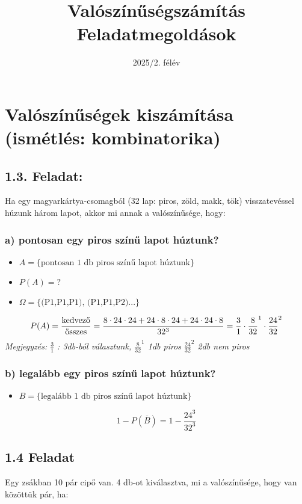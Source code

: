 \documentclass{article}
\title{Valószínűségszámítás Feladatmegoldások}
\author{}
\date{2025/2. félév}
\begin{document}
\maketitle

\section{Valószínűségek kiszámítása (ismétlés: kombinatorika)}

\subsection*{1.3. Feladat:}
Ha egy magyarkártya-csomagból (32 lap: piros, zöld, makk, tök) visszatevéssel húzunk három lapot, akkor mi
annak a valószínűsége, hogy:

\subsubsection*{a) pontosan egy piros színű lapot húztunk?}
\begin{itemize}
    \item $A = \text{\{pontosan 1 db piros színű lapot húztunk\}}$
    \item $P(A) = ?$
    \item $ \Omega = \text{\{(P1,P1,P1), (P1,P1,P2)...\}}$
\end{itemize}
\[P(A) = \frac{\text{kedvező}}{\text{összes}} = 
    \frac{8 \cdot 24 \cdot 24 + 24 \cdot 8 \cdot 24 + 24 \cdot 24 \cdot 8}{32^3} = \\
    \frac{3}{1} \cdot \frac{8}{32}^1 \cdot \frac{24}{32}^2
\]
\textit{Megjegyzés:  $\frac{3}{1}$ : 3db-ból választunk, $\frac{8}{32}^1$ 1db piros  $\frac{24}{32}^2$ 2db nem piros}

\vspace{1em} 
\subsubsection*{b) legalább egy piros színű lapot húztunk?}
\begin{itemize}
    \item $B = \text{\{legalább 1 db piros színű lapot húztunk\}}$
\end{itemize}
\[1-P( \overline B) = 1 - \frac{24^3}{32^3}\]


\subsection*{1.4 Feladat}
Egy zsákban 10 pár cipő van. 4 db-ot kiválasztva, mi a valószínűsége, hogy van közöttük pár, ha:
\end{document}
